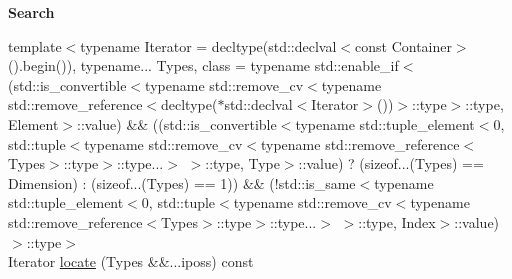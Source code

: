 \begin{Indent}{\bf Search}
\begin{DoxyCompactItemize}
{\footnotesize template$<$typename Iterator  = decltype(std\-::declval$<$const Container$>$().\-begin()), typename... Types, class  = typename std\-::enable\-\_\-if$<$(std\-::is\-\_\-convertible$<$typename std\-::remove\-\_\-cv$<$typename std\-::remove\-\_\-reference$<$decltype($\ast$std\-::declval$<$\-Iterator$>$())$>$\-::type$>$\-::type, Element$>$\-::value) \&\& ((std\-::is\-\_\-convertible$<$typename std\-::tuple\-\_\-element$<$0, std\-::tuple$<$typename std\-::remove\-\_\-cv$<$typename std\-::remove\-\_\-reference$<$\-Types$>$\-::type$>$\-::type...$>$ $>$\-::type, Type$>$\-::value) ? (sizeof...(\-Types) == Dimension) \-: (sizeof...(\-Types) == 1)) \&\& (!std\-::is\-\_\-same$<$typename std\-::tuple\-\_\-element$<$0, std\-::tuple$<$typename std\-::remove\-\_\-cv$<$typename std\-::remove\-\_\-reference$<$\-Types$>$\-::type$>$\-::type...$>$ $>$\-::type, Index$>$\-::value)$>$\-::type$>$ }\\Iterator \hyperlink{exceptionmagrathea_1_1SimpleHyperOctree_a773395c6154e9b955e01f543014514a5}{locate} (Types \&\&...iposs) const 
\end{DoxyCompactItemize}
\end{Indent}
